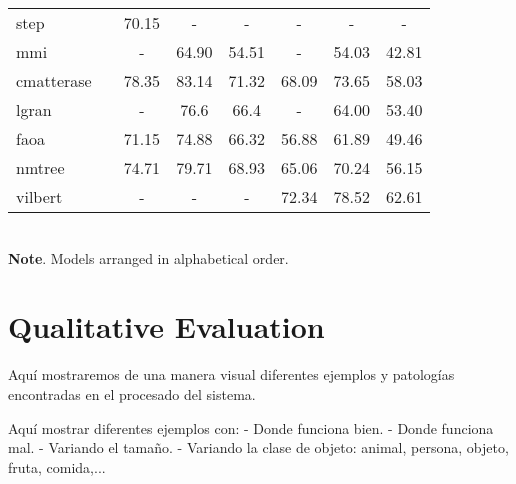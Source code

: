 \begin{table}[p]
\begin{tabular}{lc*6c}
    \acs{step}       & \cite{chen19:see_throug_text_group_refer_image_segmen}       & 70.15      & -            & -            & -          & -            & -            \\
    \acs{mmi}        & \cite{mao16:gener}                                           & -          & 64.90        & 54.51        & -          & 54.03        & 42.81        \\
    \acs{cmatterase} & \cite{liu19:improv_refer_expres_groun_cross_atten_erasin}    & 78.35      & 83.14        & 71.32        & 68.09      & 73.65        & 58.03        \\
    \acs{lgran}      & \cite{wang19:neigh}                                          & -          & 76.6         & 66.4         & -          & 64.00        & 53.40        \\
    \acs{faoa}       & \cite{yang19:fast_accur_one_stage_approac_visual_groun}      & 71.15      & 74.88        & 66.32        & 56.88      & 61.89        & 49.46        \\
    \acs{nmtree}     & \cite{liu19:learn_assem_neural_modul_tree}                   & 74.71      & 79.71        & 68.93        & 65.06      & 70.24        & 56.15        \\
    \acs{vilbert}    & \cite{lu19:vilber}                                           & -          & -            & -            & 72.34      & 78.52        & 62.61        \\
    \bottomrule
  \end{tabular}\\[1.25ex]
  {\small\textbf{Note}. Models arranged in alphabetical order.}
\end{table}


















\section{Qualitative Evaluation}

Aquí mostraremos de una manera visual diferentes ejemplos y patologías
encontradas en el procesado del sistema.


Aquí mostrar diferentes ejemplos con:
- Donde funciona bien.
- Donde funciona mal.
- Variando el tamaño.
- Variando la clase de objeto: animal, persona, objeto, fruta, comida,...
